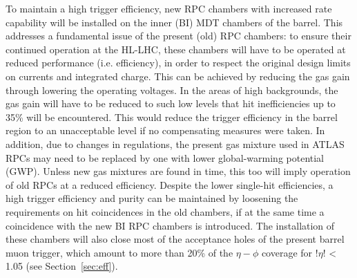 \noindent To maintain a high trigger efficiency, new RPC chambers with increased rate capability will be installed on the inner (BI) MDT chambers of the barrel. This addresses a fundamental issue
of the present (old) RPC chambers: to ensure their continued operation at the HL-LHC,
these chambers will have to be operated at reduced performance (i.e. efficiency), in order to
respect the original design limits on currents and integrated charge. This can be achieved
by reducing the gas gain through lowering the operating voltages. In the areas of high
backgrounds, the gas gain will have to be reduced to such low levels that hit inefficiencies
up to 35\% will be encountered. This would reduce the trigger efficiency in the barrel region
to an unacceptable level if no compensating measures were taken. In addition, due
to changes in regulations, the present gas mixture used in ATLAS RPCs may need to be
replaced by one with lower global-warming potential (GWP). Unless new gas mixtures are
found in time, this too will imply operation of old RPCs at a reduced efficiency. Despite
the lower single-hit efficiencies, a high trigger efficiency and purity can be maintained by
loosening the requirements on hit coincidences in the old chambers, if at the same time a
coincidence with the new BI RPC chambers is introduced. The installation of these chambers
will also close most of the acceptance holes of the present barrel muon trigger, which
amount to more than 20\% of the $\eta-\phi$ coverage for $!\eta!$ < 1.05 (see Section~\ref{sec:eff}).\\

